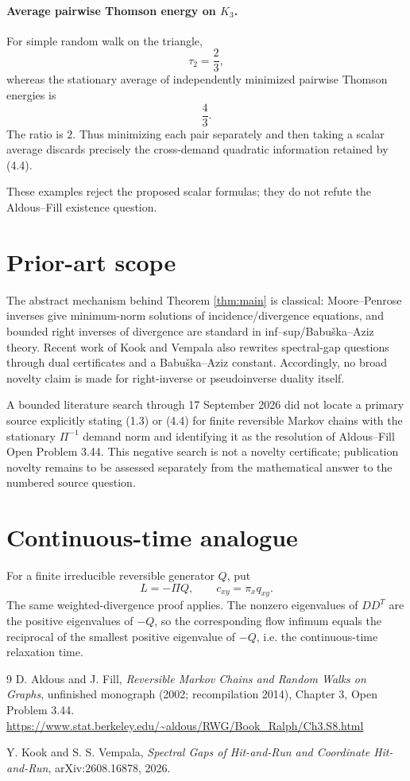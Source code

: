 \documentclass[11pt]{article}
\begin{document}
\paragraph{Average pairwise Thomson energy on $K_3$.}
For simple random walk on the triangle,
\[
\tau_2=\frac23,
\]
whereas the stationary average of independently minimized pairwise Thomson energies is
\[
\frac43.
\]
The ratio is $2$. Thus minimizing each pair separately and then taking a scalar average discards precisely the cross-demand quadratic information retained by (4.4).

These examples reject the proposed scalar formulas; they do not refute the Aldous--Fill existence question.

\section{Prior-art scope}
The abstract mechanism behind Theorem \ref{thm:main} is classical: Moore--Penrose inverses give minimum-norm solutions of incidence/divergence equations, and bounded right inverses of divergence are standard in inf--sup/Babu\v{s}ka--Aziz theory. Recent work of Kook and Vempala also rewrites spectral-gap questions through dual certificates and a Babu\v{s}ka--Aziz constant. Accordingly, no broad novelty claim is made for right-inverse or pseudoinverse duality itself.

A bounded literature search through 17 September 2026 did not locate a primary source explicitly stating (1.3) or (4.4) for finite reversible Markov chains with the stationary $\Pi^{-1}$ demand norm and identifying it as the resolution of Aldous--Fill Open Problem 3.44. This negative search is not a novelty certificate; publication novelty remains to be assessed separately from the mathematical answer to the numbered source question.

\section{Continuous-time analogue}
For a finite irreducible reversible generator $Q$, put
\[
L=-\Pi Q,
\qquad
c_{xy}=\pi_xq_{xy}.
\]
The same weighted-divergence proof applies. The nonzero eigenvalues of $DD^T$ are the positive eigenvalues of $-Q$, so the corresponding flow infimum equals the reciprocal of the smallest positive eigenvalue of $-Q$, i.e. the continuous-time relaxation time.

\begin{thebibliography}{9}
D. Aldous and J. Fill,
\emph{Reversible Markov Chains and Random Walks on Graphs},
unfinished monograph (2002; recompilation 2014), Chapter 3, Open Problem 3.44.
\url{https://www.stat.berkeley.edu/~aldous/RWG/Book_Ralph/Ch3.S8.html}

Y. Kook and S. S. Vempala,
\emph{Spectral Gaps of Hit-and-Run and Coordinate Hit-and-Run},
arXiv:2608.16878, 2026.
\end{thebibliography}
\end{document}
